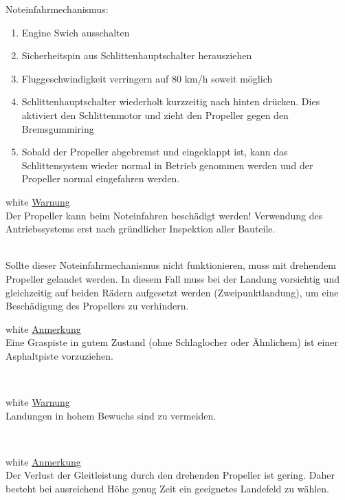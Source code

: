 Noteinfahrmechanismus:
\begin{enumerate}
\item Engine Swich ausschalten
\item Sicherheitspin aus Schlittenhauptschalter herausziehen
\item Fluggeschwindigkeit verringern auf 80 km/h soweit möglich
\item Schlittenhauptschalter wiederholt kurzzeitig nach hinten drücken. Dies aktiviert den Schlittenmotor und zieht den Propeller gegen den Bremsgummiring
\item Sobald der Propeller abgebremst und eingeklappt ist, kann das Schlittensystem wieder normal in Betrieb genommen werden und der Propeller normal eingefahren werden.
\end{enumerate}

\begin{color}{white}
\large{\underline{Warnung}}\\
Der Propeller kann beim Noteinfahren beschädigt werden! Verwendung des Antriebssystems erst nach gründlicher Inspektion aller Bauteile.
\end{color}\\

Sollte dieser Noteinfahrmechanismus nicht funktionieren, muss mit drehendem Propeller gelandet werden. In diesem Fall muss bei der Landung vorsichtig und gleichzeitig auf beiden Rädern aufgesetzt werden (Zweipunktlandung), um eine Beschädigung des Propellers zu verhindern.\\

\begin{color}{white}
\large{\underline{Anmerkung}}\\
Eine Graspiste in gutem Zustand (ohne Schlaglocher oder Ähnlichem) ist einer Asphaltpiste vorzuziehen.
\end{color}\\

\begin{color}{white}
\large{\underline{Warnung}}\\
Landungen in hohem Bewuchs sind zu vermeiden.
\end{color}\\

\begin{color}{white}
\large{\underline{Anmerkung}}\\
Der Verlust der Gleitleistung durch den drehenden Propeller ist gering. Daher besteht bei ausreichend Höhe genug Zeit ein geeignetes Landefeld zu wählen.
\end{color}\\


